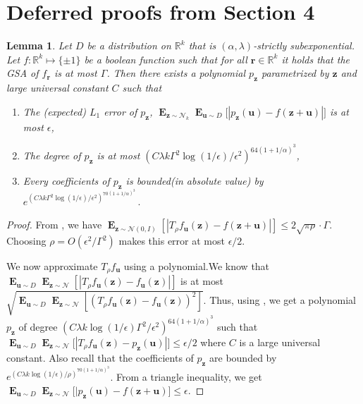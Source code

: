 \documentclass[10pt,a4paper]{article}
\newtheorem{lemma}{Lemma}[section]
\renewcommand\vec[1]{\mathbf{#1}}
\DeclareMathOperator*{\E}{\mathbf{E}}
\newcommand{\R}{\mathbb{R}}
\newcommand{\1}{\Ind}
\newcommand{\vu}{\vec u}
\newcommand{\z}{\vec z}
\newcommand{\Gauss}{\mathcal{N}}
\begin{document}
\section{Deferred proofs from Section 4}
\begin{lemma}
    \label{lem:poly_approx_boolean_subexp}
    Let $D$ be a distribution on $\R^k$ that is $(\alpha,\lambda)$-strictly subexponential. Let $f:\R^k \mapsto \{\pm 1\}$ be a boolean function such that
    for all $\vec r \in \R^k$ it holds that 
    the GSA of $f_{\vec r}$  is at most $\Gamma$. Then there exists a polynomial $p_{\z}$ parametrized by $\z$ and large universal constant $C$ such that 
    \begin{enumerate}
        \item The (expected) $L_1$ error of $p_{\z}$, $\E_{\z\sim \Gauss_k}\E_{\vu\sim D}\bigl[|p_{\z}(\vu)-f(\z+\vu)|\bigr]$ is at most $\epsilon$,
        \item The degree of $p_{\z}$ is at most $\left(C\lambda k\Gamma^2\log (1/\epsilon)/\epsilon^2\right)^{64(1+1/\alpha)^3} $,
        \item Every coefficients of $p_{\z}$ is bounded(in absolute value) by $e^{\left(C\lambda k\Gamma^2\log (1/\epsilon)/\epsilon^2\right)^{70(1+1/\alpha)^3}}\,.$
    \end{enumerate}
\end{lemma}

\begin{proof}
   From , we have 
$\E_{\z\sim\mathcal{N}(0,I)}\left[\left|T_\rho f_{\vu}(\z)-f(\z+\vu)\right|\right]\leq  2\sqrt{\pi\rho}\cdot \Gamma$. Choosing $\rho=O(\epsilon^2/\Gamma^2)$ makes this error at most $\epsilon/2$. 

We now approximate $T_{\rho}f_{\vu}$ using a polynomial.We know that 
    $\E_{\vu\sim D}\E_{\z\sim\Gauss}\left[\left|T_\rho f_{\vu}(\z)-f_{\vu}(\z)\right|\right]$ is at most $\sqrt{\E_{\vu\sim D}\E_{\z\sim\Gauss}\left[\left(T_\rho f_{\vu}(\z)-f_{\vu}(\z)\right)^2\right]}$. Thus, using  , we get a polynomial $p_{\z}$ of degree $\left(C\lambda k\log (1/\epsilon)\Gamma^2/\epsilon^2\right)^{64(1+1/\alpha)^3}$ such that
$\E_{\vu\sim D}\E_{\z\sim \Gauss}\bigl[|T_{\rho}f_{\vu}(\z)-p_{\z}(\vu)|\bigr]\leq \epsilon/2$ where $C$ is a large universal constant. Also recall that the coefficients of $p_{\z}$ are bounded by $e^{\left(C\lambda k\log (1/\epsilon)/\rho\right)^{70(1+1/\alpha)^3}}$. From a triangle inequality, we get 
$\E_{\vu\sim D}\E_{\z\sim \Gauss}\bigl[|p_{\z}(\vu)-f(\z+\vu)\bigr]\leq \epsilon$.
\end{proof}
\end{document}
